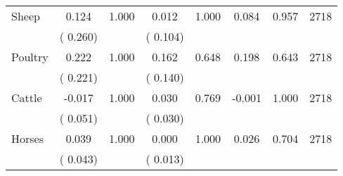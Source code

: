 \begin{tabular}{l*{7}{c}}
 Sheep       &              0.124       &        1.000  &              0.012       &        1.000  &              0.084       &              0.957 &  2718 \\ 
                       &       (       0.260)             &                               &       (       0.104)                     &                               &                                               &                                &                      \\ 

 Poultry       &              0.222       &        1.000  &              0.162       &        0.648  &              0.198       &              0.643 &  2718 \\ 
                       &       (       0.221)             &                               &       (       0.140)                     &                               &                                               &                                &                      \\ 

 Cattle       &             -0.017       &        1.000  &              0.030       &        0.769  &             -0.001       &              1.000 &  2718 \\ 
                       &       (       0.051)             &                               &       (       0.030)                     &                               &                                               &                                &                      \\ 

 Horses       &              0.039       &        1.000  &              0.000       &        1.000  &              0.026       &              0.704 &  2718 \\ 
                       &       (       0.043)             &                               &       (       0.013)                     &                               &                                               &                                &                      \\ 

\hline \end{tabular}